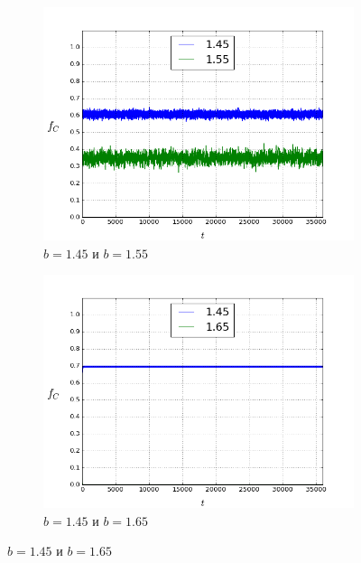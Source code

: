 \documentclass[a4paper]{article}
\begin{document}
\begin{figure}
	\begin{subfigure}{.5\textwidth}
		\includegraphics[width=.8\linewidth]{145-155.png}
		\caption{$b=1.45$ и $b=1.55$}
	\end{subfigure}
	\begin{subfigure}{.5\textwidth}
		\includegraphics[width=.8\linewidth]{145-165.png}
		\caption{$b=1.45$ и $b=1.65$}
	\end{subfigure}%
\end{figure}
\end{document}
